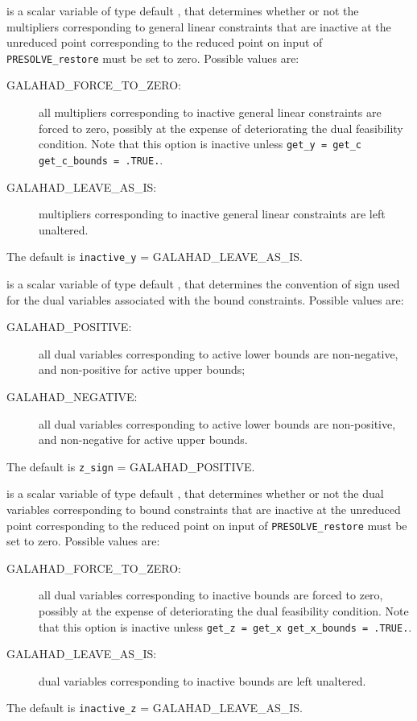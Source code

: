 \documentclass{galahad}
\newcommand{\packagename}{PRESOLVE}
\newcommand{\sym}{\sf\small}
\begin{document}
\begin{description}
 is a scalar variable of type default \integer, that
determines whether or not the multipliers corresponding
to general linear constraints that are inactive at the unreduced point
corresponding to the reduced point on input of {\tt \packagename\_restore}
must be set to zero. Possible values are:
\begin{description}
\item[\sym GALAHAD\_FORCE\_TO\_ZERO:] all multipliers corresponding to inactive 
                     general linear constraints are forced to zero,
                     possibly at the expense of deteriorating the
                     dual feasibility condition.
                     Note that this option is inactive unless
                     {\tt get\_y = get\_c get\_c\_bounds = .TRUE.}.
\item[\sym GALAHAD\_LEAVE\_AS\_IS:] multipliers corresponding to inactive 
                   general linear constraints are left unaltered.
\end{description}
The default is {\tt inactive\_y} = {\sym GALAHAD\_LEAVE\_AS\_IS}.

is a scalar variable of type default \integer, that
determines the convention of sign used for the dual 
variables associated with the bound constraints. Possible values are:
\begin{description}
\item[\sym GALAHAD\_POSITIVE:] all dual variables corresponding to 
                active lower bounds are non-negative, and
                non-positive for active upper bounds;
\item[\sym GALAHAD\_NEGATIVE:] all dual variables corresponding to 
                active lower bounds are non-positive, and
               non-negative for active upper bounds.
\end{description}
The default is {\tt z\_sign} = {\sym GALAHAD\_POSITIVE}.

 is a scalar variable of type default \integer, that
determines whether or not the dual variables corresponding
to bound constraints that are inactive at the unreduced point
corresponding to the reduced point on input of {\tt \packagename\_restore}
must be set to zero. Possible values are:
\begin{description}
\item[\sym GALAHAD\_FORCE\_TO\_ZERO:] all dual variables corresponding to inactive 
                     bounds are forced to zero,
                     possibly at the expense of deteriorating the
                     dual feasibility condition.
                     Note that this option is inactive unless
                     {\tt get\_z = get\_x get\_x\_bounds = .TRUE.}.
\item[\sym GALAHAD\_LEAVE\_AS\_IS:] dual variables corresponding to inactive 
                   bounds are left unaltered.
\end{description}
The default is {\tt inactive\_z} = {\sym GALAHAD\_LEAVE\_AS\_IS}.


\end{description}
\end{document}
